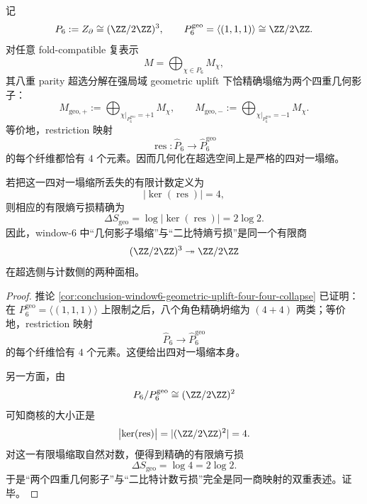 \begin{theorem}[几何影子的四重塌缩与有限熵亏损同一性]\label{thm:conclusion-window6-geometric-shadow-fourfold-collapse-entropy-identity}
记
\[
P_6:=Z_{\partial}\cong (\ZZ/2\ZZ)^3,
\qquad
P_6^{\mathrm{geo}}=\langle(1,1,1)\rangle\cong \ZZ/2\ZZ.
\]
对任意 fold-compatible 复表示
\[
M=\bigoplus_{\chi\in \widehat P_6}M_{\chi},
\]
其八重 parity 超选分解在强局域 geometric uplift 下恰精确塌缩为两个四重几何影子：
\[
M_{\mathrm{geo},+}
:=
\bigoplus_{\chi|_{P_6^{\mathrm{geo}}}=+1}M_{\chi},
\qquad
M_{\mathrm{geo},-}
:=
\bigoplus_{\chi|_{P_6^{\mathrm{geo}}}=-1}M_{\chi}.
\]
等价地，restriction 映射
\[
\operatorname{res}:\widehat P_6\to \widehat P_6^{\mathrm{geo}}
\]
的每个纤维都恰有 \(4\) 个元素。因而几何化在超选空间上是严格的四对一塌缩。

若把这一四对一塌缩所丢失的有限计数定义为
\[
\bigl|\ker(\operatorname{res})\bigr|=4,
\]
则相应的有限熵亏损精确为
\[
\Delta S_{\mathrm{geo}}=\log \bigl|\ker(\operatorname{res})\bigr|=2\log 2.
\]
因此，window-\(6\) 中“几何影子塌缩”与“二比特熵亏损”是同一个有限商
\[
(\ZZ/2\ZZ)^3\twoheadrightarrow \ZZ/2\ZZ
\]
在超选侧与计数侧的两种面相。
\end{theorem}
\begin{proof}
推论 \ref{cor:conclusion-window6-geometric-uplift-four-four-collapse} 已证明：在 \(P_6^{\mathrm{geo}}=\langle(1,1,1)\rangle\) 上限制之后，八个角色精确坍缩为 \((4+4)\) 两类；等价地，restriction 映射
\[
\widehat P_6\to \widehat P_6^{\mathrm{geo}}
\]
的每个纤维恰有 \(4\) 个元素。这便给出四对一塌缩本身。

另一方面，由
\[
P_6/P_6^{\mathrm{geo}}\cong (\ZZ/2\ZZ)^2
\]
可知商核的大小正是
\[
\bigl|\ker(\operatorname{res})\bigr|=|(\ZZ/2\ZZ)^2|=4.
\]
对这一有限塌缩取自然对数，便得到精确的有限熵亏损
\[
\Delta S_{\mathrm{geo}}=\log 4=2\log 2.
\]
于是“两个四重几何影子”与“二比特计数亏损”完全是同一商映射的双重表述。证毕。
\end{proof}

